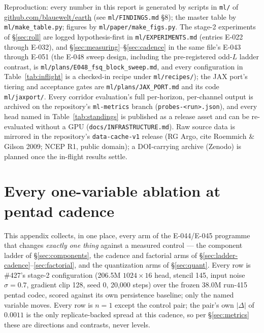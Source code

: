 \documentclass[10pt]{article}
\begin{document}
\vspace{4pt}
{\color{ink2}\small Reproduction: every number in this report is
generated by scripts in \texttt{ml/} of
\href{https://github.com/blauewelt/earth}{github.com/blauewelt/earth}
(see \texttt{ml/FINDINGS.md} \S8); the master table by
\texttt{ml/make\_table.py}; figures by \texttt{ml/paper/make\_figs.py}.
The stage-2 experiments of \S\ref{sec:roll} are logged
hypothesis-first in \texttt{ml/EXPERIMENTS.md} (entries E-022 through
E-032), and \S\ref{sec:measuring}--\S\ref{sec:cadence} in the same file's
E-043 through E-051 (the E-048 sweep design, including the pre-registered
odd-$L$ ladder contrast, is \texttt{ml/plans/E048\_fsq\_block\_sweep.md}, and
every configuration in Table~\ref{tab:inflight} is a checked-in recipe under
\texttt{ml/recipes/}); the JAX port's tiering and acceptance gates are
\texttt{ml/plans/JAX\_PORT.md} and its code
\texttt{ml/jaxport/}. Every corridor evaluation's full per-horizon, per-channel
output is archived on the repository's \texttt{ml-metrics} branch
(\texttt{probes-\textless run\textgreater.json}), and every head named
in Table~\ref{tab:standings} is published as a release asset and can be
re-evaluated without a GPU (\texttt{docs/INFRASTRUCTURE.md}).
Raw source data is mirrored in the repository's \texttt{data-cache-v1}
release (RG Argo, cite Roemmich \& Gilson 2009; NCEP R1, public
domain); a DOI-carrying archive (Zenodo) is planned once the in-flight
results settle.}

\section{Every one-variable ablation at pentad cadence}\label{app:ablations}

This appendix collects, in one place, every arm of the E-044/E-045 programme
that changes \emph{exactly one thing} against a measured control --- the
component ladder of \S\ref{sec:components}, the cadence and factorial arms of
\S\ref{sec:ladder-cadence}--\ref{sec:factorial}, and the quantization arms of
\S\ref{sec:quant}. Every row is \#427's stage-2 configuration (206.5M
$1024\times16$ head, stencil 145, input noise $\sigma{=}0.7$, gradient clip
128, seed 0, 20{,}000 steps) over the frozen 38.0M run-415 pentad codec,
scored against its own persistence baseline; only the named variable moves.
Every row is $n{=}1$ except the control pair; the pair's own $|\Delta|$ of
$0.0011$ is the only replicate-backed spread at this cadence, so per
\S\ref{sec:metrics} these are directions and contrasts, never levels.
\end{document}
